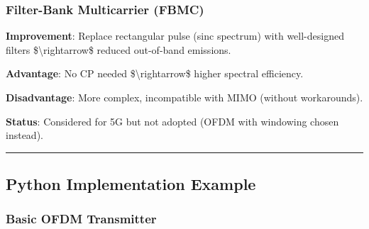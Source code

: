 \subsubsection{Filter-Bank Multicarrier
(FBMC)}\label{filter-bank-multicarrier-fbmc}

\textbf{Improvement}: Replace rectangular pulse (sinc spectrum) with
well-designed filters \$\textbackslash rightarrow\$ reduced out-of-band
emissions.

\textbf{Advantage}: No CP needed \$\textbackslash rightarrow\$ higher
spectral efficiency.

\textbf{Disadvantage}: More complex, incompatible with MIMO (without
workarounds).

\textbf{Status}: Considered for 5G but not adopted (OFDM with windowing
chosen instead).

\begin{center}\rule{0.5\linewidth}{0.5pt}\end{center}

\subsection{\texorpdfstring{ Python Implementation
Example}{ Python Implementation Example}}\label{python-implementation-example}

\subsubsection{Basic OFDM Transmitter}\label{basic-ofdm-transmitter}

